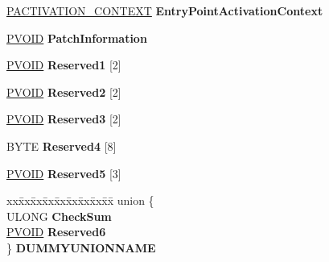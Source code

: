 \begin{DoxyCompactItemize}
\begin{tabbing}
\end{tabbing}\item 
\mbox{\label{struct___l_d_r___d_a_t_a___t_a_b_l_e___e_n_t_r_y_a1067f335a89d12e12592276397c6bb3f}} 
\hyperlink{interfacevoid}{P\+A\+C\+T\+I\+V\+A\+T\+I\+O\+N\+\_\+\+C\+O\+N\+T\+E\+XT} {\bfseries Entry\+Point\+Activation\+Context}
\item 
\mbox{\label{struct___l_d_r___d_a_t_a___t_a_b_l_e___e_n_t_r_y_af9ba6f02d5e97ae0c7b762d74ac953f8}} 
\hyperlink{interfacevoid}{P\+V\+O\+ID} {\bfseries Patch\+Information}
\item 
\mbox{\label{struct___l_d_r___d_a_t_a___t_a_b_l_e___e_n_t_r_y_ae9747e460febcfd12fc36b72edeec936}} 
\hyperlink{interfacevoid}{P\+V\+O\+ID} {\bfseries Reserved1} \mbox{[}2\mbox{]}
\item 
\mbox{\label{struct___l_d_r___d_a_t_a___t_a_b_l_e___e_n_t_r_y_af41568e65f5c71fdbb90242a3863936f}} 
\hyperlink{interfacevoid}{P\+V\+O\+ID} {\bfseries Reserved2} \mbox{[}2\mbox{]}
\item 
\mbox{\label{struct___l_d_r___d_a_t_a___t_a_b_l_e___e_n_t_r_y_a560ad91b8834360d4be4bdb3313b6547}} 
\hyperlink{interfacevoid}{P\+V\+O\+ID} {\bfseries Reserved3} \mbox{[}2\mbox{]}
\item 
\mbox{\label{struct___l_d_r___d_a_t_a___t_a_b_l_e___e_n_t_r_y_acdb71a6f4bea5f3a059e7d4544660f41}} 
B\+Y\+TE {\bfseries Reserved4} \mbox{[}8\mbox{]}
\item 
\mbox{\label{struct___l_d_r___d_a_t_a___t_a_b_l_e___e_n_t_r_y_ac2a2d9255564374d9ab6f50347fc4881}} 
\hyperlink{interfacevoid}{P\+V\+O\+ID} {\bfseries Reserved5} \mbox{[}3\mbox{]}
\item 
\mbox{\label{struct___l_d_r___d_a_t_a___t_a_b_l_e___e_n_t_r_y_a2acb9a5247137b8bd5d7c2664940df30}} 
\begin{tabbing}
xx\=xx\=xx\=xx\=xx\=xx\=xx\=xx\=xx\=\kill
union \{\\
\>ULONG {\bfseries CheckSum}\\
\>\hyperlink{interfacevoid}{PVOID} {\bfseries Reserved6}\\
\} {\bfseries DUMMYUNIONNAME}\\

\end{tabbing}\end{DoxyCompactItemize}


